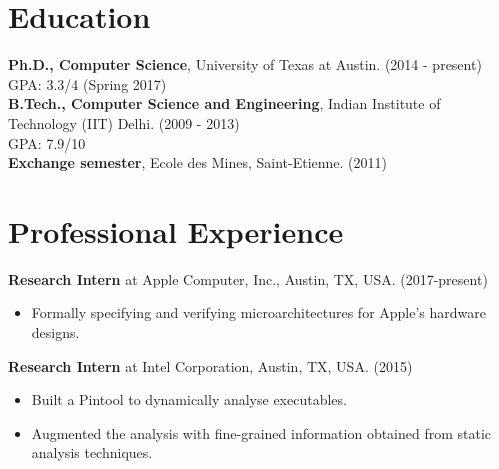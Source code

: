 \documentclass[margin]{res}
\begin{document}
 
 
 
\address{Department of Computer Science \\University of Texas at Austin }

\address{+1 512-952-0104 \\ mihir@cs.utexas.edu }

 
\begin{resume} 
 

\section{Education} 
{\bf Ph.D., Computer Science}, University of Texas at Austin. \hfill (2014 - present)\\
GPA: 3.3/4 \hfill (Spring 2017)\\
{\bf B.Tech., Computer Science and Engineering}, Indian Institute of
Technology (IIT) Delhi. \hfill (2009 - 2013)\\
GPA: 7.9/10\\
{\bf Exchange semester}, Ecole des Mines, Saint-Etienne. \hfill (2011)

\section{Professional Experience}
 
 {\bf Research Intern} at Apple Computer, Inc., Austin, TX, USA. \hfill (2017-present)
 \begin{itemize} \itemsep -2pt  %
 \item Formally specifying and verifying microarchitectures for
   Apple's hardware designs.
 \end{itemize}
 
 {\bf Research Intern} at Intel Corporation, Austin, TX, USA. \hfill (2015)
 \begin{itemize} \itemsep -2pt  %
 \item Built a Pintool to dynamically analyse executables.
 \item Augmented
   the analysis with fine-grained information obtained from static
   analysis techniques.
 \end{itemize}


\end{resume}
\end{document}
